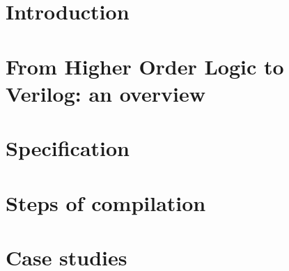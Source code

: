 \documentclass{llncs}
\begin{document}
\section{Introduction}
\label{secIntroduction}



\section{From Higher Order Logic to Verilog: an overview}
\label{secHOL2Verilog}


\section{Specification}
\label{secSpecification}


\section{Steps of compilation}
\label{secImplementation}


%

\section{Case studies}
\label{secCaseStudy}

\end{document}

